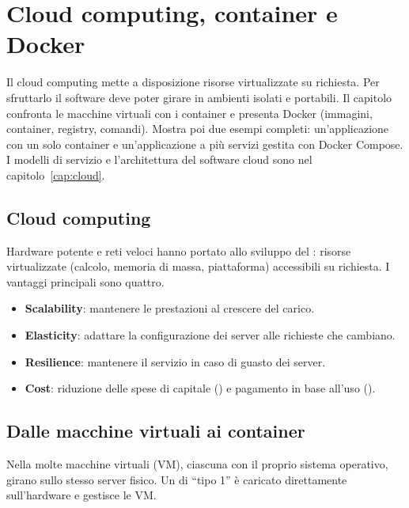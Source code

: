 \chapter{Cloud computing, container e Docker}
\label{cap:container}

\begin{inbreve}
Il cloud computing mette a disposizione risorse virtualizzate su richiesta. Per sfruttarlo il software deve poter
girare in ambienti isolati e portabili. Il capitolo confronta le macchine virtuali con i container e presenta
Docker (immagini, container, registry, comandi). Mostra poi due esempi completi: un'applicazione con un solo
container e un'applicazione a più servizi gestita con Docker Compose. I modelli di servizio e l'architettura del
software cloud sono nel capitolo~\ref{cap:cloud}.
\end{inbreve}

\section{Cloud computing}
\label{sec:container-cloud}

Hardware potente e reti veloci hanno portato allo sviluppo del : risorse virtualizzate
(calcolo, memoria di massa, piattaforma) accessibili su richiesta. I vantaggi principali sono quattro.

\begin{itemize}
  \item \textbf{Scalability}: mantenere le prestazioni al crescere del carico.
  \item \textbf{Elasticity}: adattare la configurazione dei server alle richieste che cambiano.
  \item \textbf{Resilience}: mantenere il servizio in caso di guasto dei server.
  \item \textbf{Cost}: riduzione delle spese di capitale () e pagamento in base all'uso
    ().
\end{itemize}

\section{Dalle macchine virtuali ai container}
\label{sec:container-vm}

Nella  molte macchine virtuali (VM), ciascuna con il proprio sistema operativo,
girano sullo stesso server fisico. Un  di ``tipo 1'' è caricato direttamente sull'hardware e
gestisce le VM.

